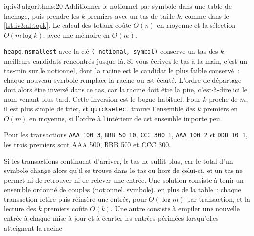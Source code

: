 \begin{solution}{iq:iv3:algorithms:20}
Additionner le notionnel par symbole dans une table de hachage, puis prendre les $k$ premiers avec un tas de taille $k$, comme dans le \cref{lst:iv3:al:topk}. Le calcul des totaux coûte $O(n)$ en moyenne et la sélection $O(m \log k)$, avec une mémoire en $O(m)$.
\label{lst:iv3:al:topk}

\texttt{heapq.nsmallest} avec la clé \texttt{(-notional, symbol)} conserve un tas des $k$ meilleurs candidats rencontrés jusque-là. Si vous écrivez le tas à la main, c'est un tas-min sur le notionnel, dont la racine est le candidat le plus faible conservé~: chaque nouveau symbole remplace la racine ou est écarté. L'ordre de départage doit alors être inversé dans ce tas, car la racine doit être la pire, c'est-à-dire ici le nom venant plus tard. Cette inversion est le bogue habituel. Pour $k$ proche de $m$, il est plus simple de trier, et \texttt{quickselect} trouve l'ensemble des $k$ premiers en $O(m)$ en moyenne, si l'ordre à l'intérieur de cet ensemble importe peu.

Pour les transactions \texttt{AAA 100 3}, \texttt{BBB 50 10}, \texttt{CCC 300 1}, \texttt{AAA 100 2} et \texttt{DDD 10 1}, les trois premiers sont AAA 500, BBB 500 et CCC 300.

Si les transactions continuent d'arriver, le tas ne suffit plus, car le total d'un symbole change alors qu'il se trouve dans le tas ou hors de celui-ci, et un tas ne permet ni de retrouver ni de relever une entrée. Une solution consiste à tenir un ensemble ordonné de couples (notionnel, symbole), en plus de la table~: chaque transaction retire puis réinsère une entrée, pour $O(\log m)$ par transaction, et la lecture des $k$ premiers coûte $O(k)$. Une autre consiste à empiler une nouvelle entrée à chaque mise à jour et à écarter les entrées périmées lorsqu'elles atteignent la racine.

\end{solution}

